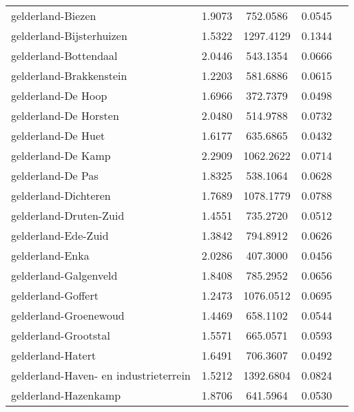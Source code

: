 \begin{longtable}{llccc}
	gelderland-Biezen                         & 1.9073  & 752.0586  & 0.0545                 \\
	gelderland-Bijsterhuizen                  & 1.5322  & 1297.4129 & 0.1344                 \\
	gelderland-Bottendaal                     & 2.0446  & 543.1354  & 0.0666                 \\
	gelderland-Brakkenstein                   & 1.2203  & 581.6886  & 0.0615                 \\
	gelderland-De Hoop                        & 1.6966  & 372.7379  & 0.0498                 \\
	gelderland-De Horsten                     & 2.0480  & 514.9788  & 0.0732                 \\
	gelderland-De Huet                        & 1.6177  & 635.6865  & 0.0432                 \\
	gelderland-De Kamp                        & 2.2909  & 1062.2622 & 0.0714                 \\
	gelderland-De Pas                         & 1.8325  & 538.1064  & 0.0628                 \\
	gelderland-Dichteren                      & 1.7689  & 1078.1779 & 0.0788                 \\
	gelderland-Druten-Zuid                    & 1.4551  & 735.2720  & 0.0512                 \\
	gelderland-Ede-Zuid                       & 1.3842  & 794.8912  & 0.0626                 \\
	gelderland-Enka                           & 2.0286  & 407.3000  & 0.0456                 \\
	gelderland-Galgenveld                     & 1.8408  & 785.2952  & 0.0656                 \\
	gelderland-Goffert                        & 1.2473  & 1076.0512 & 0.0695                 \\
	gelderland-Groenewoud                     & 1.4469  & 658.1102  & 0.0544                 \\
	gelderland-Grootstal                      & 1.5571  & 665.0571  & 0.0593                 \\
	gelderland-Hatert                         & 1.6491  & 706.3607  & 0.0492                 \\
	gelderland-Haven- en industrieterrein     & 1.5212  & 1392.6804 & 0.0824                 \\
	gelderland-Hazenkamp                      & 1.8706  & 641.5964  & 0.0530                 \\

\end{longtable}
